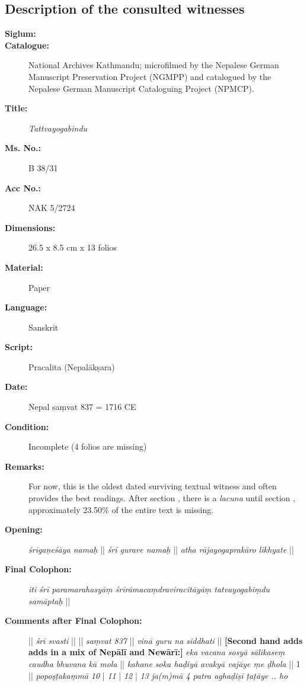 \subsection{Description of the consulted witnesses}
\vspace{0.25cm}
\begin{description}
\item[\textbf{Siglum:}] \Huge{} \nocite{ytbn1}
\item[\textbf{Catalogue:}] National Archives Kathmandu; microfilmed by the Nepalese German Manuscript Preservation Project (NGMPP) and catalogued by the Nepalese German Manuscript Cataloguing Project (NPMCP). 
\item[\textbf{Title:}] \emph{Tattvayogabindu} 
\item[\textbf{Ms. No.:}] B 38/31
\item[\textbf{Acc No.:}] NAK 5/2724
\item[\textbf{Dimensions:}] 26.5 x 8.5 cm x 13 folios 
\item[\textbf{Material:}] Paper
\item[\textbf{Language:}] Sanskrit
\item[\textbf{Script:}] Pracalita (Nepalākṣara)
\item[\textbf{Date:}] Nepal saṃvat 837 = 1716 CE
\item[\textbf{Condition:}] Incomplete (4 folios are missing)
\item[\textbf{Remarks:}] For now, this is the oldest dated surviving textual witness and often provides the best readings. After section , there is a \textit{lacuna} until section , approximately 23.50\% of the entire text is missing. 
\item[\textbf{Opening:}] \textit{śrīgaṇeśāya namaḥ} || \textit{śrī gurave namaḥ} || \textit{atha rājayogaprakāro  likhyate} ||
\item[\textbf{Final Colophon:}] \textit{iti śrī paramarahasyāṃ śrīrāmacaṃdraviracitāyāṃ tatvayogabiṃdu samāptaḥ} ||
\item[\textbf{Comments after Final Colophon:}] || \textit{śrī svasti} || || \textit{saṃvat 837} || \textit{vinā guru na siddhati} || \textbf{[Second hand adds adds in a mix of Nepālī and Newārī:]} \textit{eka vacana sosyā sālikaseṃ caudha bhuvana kā mola} || \textit{kahane soka haḍiyā avakyā vajāye ṃe ḍhola} || 1 || \textit{popoṣṭakaṃmā 10} | \textit{11} | \textit{12} | \textit{13} \textit{ja(m)mā 4 patra aghaḍiṣī ṭaṭāye .. ho} 
\end{description}
\newpage
